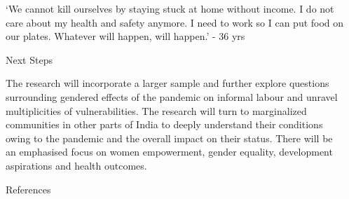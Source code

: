 \documentclass[final]{beamer}
\newlength{\sepwidth}
\newlength{\colwidth}
\newcommand{\separatorcolumn}{\begin{column}{\sepwidth}\end{column}}
\begin{document}
\begin{frame}[t]
\begin{columns}[t]
\begin{column}{\colwidth}
{  \begin{alertblock}{}

‘We cannot kill ourselves by
staying stuck at home without
income. I do not care about my
health and safety anymore. I
need to work so I can put food
on our plates. Whatever will
happen, will happen.’ - 36 yrs
  \end{alertblock}
 }

\vspace{-1cm}
  \begin{block}{Next Steps}

The research will incorporate a
larger sample and further
explore questions surrounding
gendered effects of the
pandemic on informal labour
and unravel multiplicities of
vulnerabilities. The research will
turn to marginalized
communities in other parts of
India to deeply understand their
conditions owing to the
pandemic and the overall
impact on their status. There
will be an emphasised focus on
women empowerment, gender
equality, development
aspirations and health
outcomes.
  \end{block}

\vspace{-1cm}
  \begin{block}{References}
\vspace{-0.55cm}
    \nocite{patel2021gendered}
    \nocite{Deshpande2020Covid}   
    \nocite{sirimane2020migrant}
    \footnotesize{}

  \end{block}

\end{column}
\separatorcolumn

\end{columns}
\end{frame}
\end{document}
